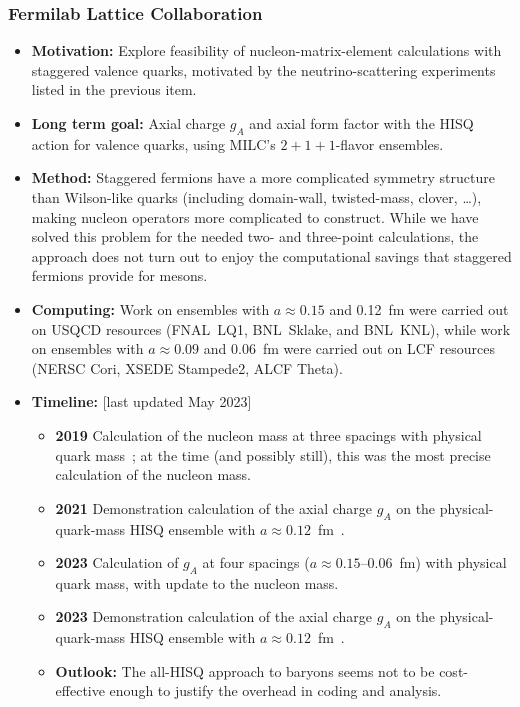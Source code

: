 \documentclass[12pt,hyperpdf]{article}
\begin{document}
\subsubsection{Fermilab Lattice Collaboration}
\begin{itemize}
   \item{\bf Motivation:} Explore feasibility of nucleon-matrix-element calculations with staggered valence quarks, motivated by the neutrino-scattering experiments listed in the previous item.
   \item{\bf Long term goal:} Axial charge $g_A$ and axial form factor with the HISQ action for valence quarks, using MILC's $2+1+1$-flavor ensembles.
   \item{\bf Method:} Staggered fermions have a more complicated symmetry structure than Wilson-like quarks (including domain-wall, twisted-mass, clover, \ldots), making nucleon operators more complicated to construct.  While we have solved this problem for the needed two- and three-point calculations, the approach does not turn out to enjoy the computational savings that staggered fermions provide for mesons.
    \item{\bf Computing:} Work on ensembles with $a\approx0.15$ and 0.12~fm were carried out on USQCD resources (FNAL~LQ1, BNL~Sklake, and BNL~KNL), while work on ensembles with $a\approx0.09$ and 0.06~fm were carried out on LCF resources (NERSC Cori, XSEDE Stampede2, ALCF Theta).
\item{\bf Timeline:} \hfill [last updated May 2023]
\begin{itemize}
   \item{\bf 2019} Calculation of the nucleon mass at three spacings with physical quark mass~\cite{Lin:2019pia}; at the time (and possibly still), this was the most precise calculation of the nucleon mass.
   \item{\bf 2021} Demonstration calculation of the axial charge $g_A$ on the physical-quark-mass HISQ ensemble with $a\approx0.12$~fm~\cite{Lin:2020wko}.
   \item{\bf 2023} Calculation of $g_A$ at four spacings ($a\approx0.15$--0.06~fm) with physical quark mass, with update to the nucleon mass.
   \item{\bf 2023} Demonstration calculation of the axial charge $g_A$ on the physical-quark-mass HISQ ensemble with $a\approx0.12$~fm~\cite{Lin:2020wko}.
\item{\bf Outlook:} The all-HISQ approach to baryons seems not to be cost-effective enough to justify the overhead in coding and analysis.
\end{itemize}
\end{itemize}
\end{document}
